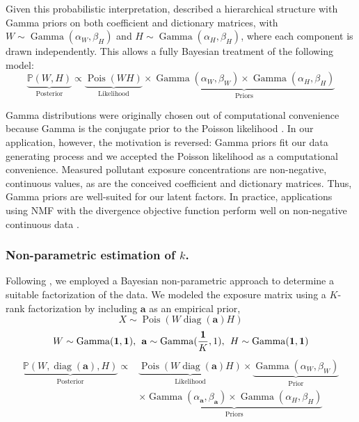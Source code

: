 Given this probabilistic interpretation, \citet{cemgil2008bayesian} described a hierarchical structure with Gamma priors on both coefficient and dictionary matrices, with ${W \sim \operatorname{Gamma}(\alpha_{W}, \beta_{H})}$ and ${H \sim \operatorname{Gamma}(\alpha_{H}, \beta_{H})}$, where each component is drawn independently. This allows a fully Bayesian treatment of the following model:
\begin{equation}
    \underbrace{\mathbb{P}(W, H)}_{\text{Posterior}}
    \propto \underbrace{\operatorname{Pois}(W H)}_{\text{Likelihood}}
    \times \underbrace{\operatorname{Gamma}(\alpha_W, \beta_W) 
    \times \operatorname{Gamma}(\alpha_H, \beta_H)}_{\text{Priors}}
\end{equation} 

Gamma distributions were originally chosen out of computational convenience because Gamma is the conjugate prior to the Poisson likelihood \citep{cemgil2008bayesian}. In our application, however, the motivation is reversed: Gamma priors fit our data generating process and we accepted the Poisson likelihood as a computational convenience. Measured pollutant exposure concentrations are non-negative, continuous values, as are the conceived coefficient and dictionary matrices. Thus, Gamma priors are well-suited for our latent factors. In practice, applications using NMF with the divergence objective function perform well on non-negative continuous data \citep{brunet2004metagenes, fevotte2009nonnegative}.

\subsubsection{Non-parametric estimation of $k$.}
\label{methods_k}
Following \citet{holtzman2018machine}, we employed a Bayesian non-parametric approach to determine a suitable factorization of the data. We modeled the exposure matrix using a $K$-rank factorization by including $\mathbf{a}$ as an empirical prior,
\begin{equation*}
{X \sim \operatorname{Pois}\left(W \operatorname{diag}(\mathbf{a}) H\right)}
\end{equation*}
\vspace{-5ex}
\begin{equation*}
{W \sim \operatorname{Gamma}(\mathbf{1}, \mathbf{1})}, \hspace{1ex}
{\mathbf{a} \sim \operatorname{Gamma}(\frac{\mathbf{1}}{K}, 1)}, \hspace{1ex} 
{H \sim \operatorname{Gamma}(\mathbf{1}, \mathbf{1})}
\end{equation*}
\vspace{-5ex}
\begin{align}
    \underbrace{\mathbb{P}(W, \operatorname{diag}(\mathbf{a}), H)}_{\text{Posterior}}
    \propto & \underbrace{\operatorname{Pois}(W\operatorname{diag}(\mathbf{a})H)}_{\text{Likelihood}}
    \times \underbrace{\operatorname{Gamma}(\alpha_W, \beta_W)}_{\text{Prior}} \\
    & \times \underbrace{\operatorname{Gamma}(\alpha_\mathbf{a}, \beta_\mathbf{a}) 
    \times \operatorname{Gamma}(\alpha_H, \beta_H)}_{\text{Priors}} \nonumber
\end{align} 

